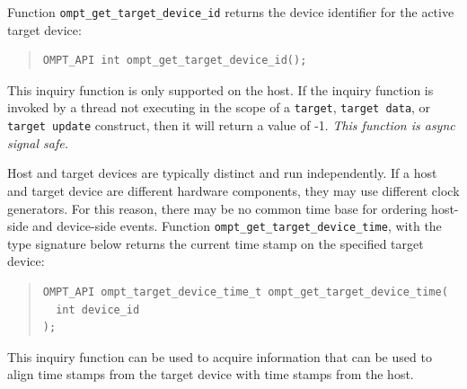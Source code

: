 \documentclass{article}
\begin{document}
Function \verb|ompt_get_target_device_id| returns the device identifier for the active target device:
\begin{quote}
\begin{verbatim}
OMPT_API int ompt_get_target_device_id();
\end{verbatim}
\end{quote}
This inquiry function is only supported on the host. If the inquiry function is invoked by a thread not executing in the scope of a {\tt target}, {\tt target data}, or {\tt target update} construct, then it will return a value of -1. {\it This function is async signal safe.}

Host and target devices are typically distinct and run independently. If a
host and target device are different hardware components, they may 
use different clock generators. For this reason,  there may be no common time base for ordering host-side and device-side events.
Function \verb|ompt_get_target_device_time|, with the type signature below returns the current time stamp on the specified target device:
\begin{quote}
\begin{verbatim}
OMPT_API ompt_target_device_time_t ompt_get_target_device_time(
  int device_id
);
\end{verbatim}
\end{quote}
This inquiry function can be used
to acquire information that can be used to align time stamps from the target device with time
stamps from the host.

\end{document}
